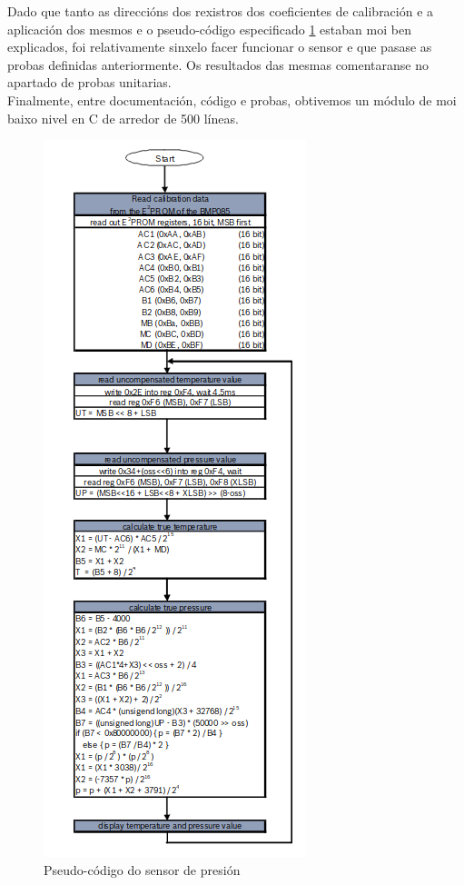    Dado que tanto as direccións dos rexistros dos coeficientes de calibración e
   a aplicación dos mesmos e o pseudo-código especificado
   \ref{figura:Bmp085PseudoCodigo} estaban moi ben explicados, foi relativamente
   sinxelo facer funcionar o sensor e que pasase as probas definidas
   anteriormente. Os resultados das mesmas comentaranse no apartado de probas
   unitarias. \\
   
   Finalmente, entre documentación, código e probas, obtivemos un módulo de moi
   baixo nivel en C de arredor de 500 líneas. \\
   
   \begin{figure}[htbp]
    \centering
    \includegraphics[scale=0.6, keepaspectratio=true]{./imagenes/bmp085-pseudocodigo.png}
    \caption{Pseudo-código do sensor de presión}
    \label{figura:Bmp085PseudoCodigo}
   \end{figure}
   

